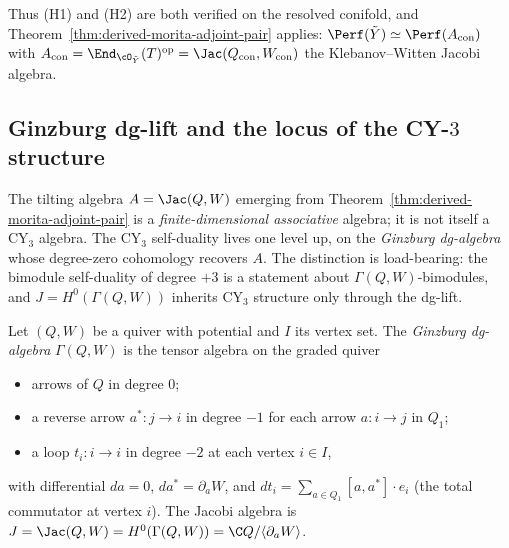 Thus (H1) and (H2) are both verified on the resolved conifold, and Theorem~\ref{thm:derived-morita-adjoint-pair} applies: $\Perf(\tilde Y) \simeq \Perf(A_{\mathrm{con}})$ with $A_{\mathrm{con}} = \End_{\cO_{\tilde Y}}(T)^{\mathrm{op}} = \Jac(Q_{\mathrm{con}}, W_{\mathrm{con}})$ the Klebanov--Witten Jacobi algebra.

\subsection{Ginzburg dg-lift and the locus of the CY-\texorpdfstring{$3$}{3} structure}
\label{subsec:ginzburg-dg-lift-cy3}

The tilting algebra $A = \Jac(Q, W)$ emerging from Theorem~\ref{thm:derived-morita-adjoint-pair} is a \emph{finite-dimensional associative} algebra; it is not itself a CY$_3$ algebra. The CY$_3$ self-duality lives one level up, on the \emph{Ginzburg dg-algebra} whose degree-zero cohomology recovers $A$. The distinction is load-bearing: the bimodule self-duality of degree $+3$ is a statement about $\Gamma(Q, W)$-bimodules, and $J = H^0(\Gamma(Q, W))$ inherits CY$_3$ structure only through the dg-lift.

\begin{definition}
\label{def:ginzburg-dg-algebra}
Let $(Q, W)$ be a quiver with potential and $I$ its vertex set. The \emph{Ginzburg dg-algebra} $\Gamma(Q, W)$ is the tensor algebra on the graded quiver
\begin{itemize}
 \item arrows of $Q$ in degree $0$;
 \item a reverse arrow $a^{*} \colon j \to i$ in degree $-1$ for each arrow $a \colon i \to j$ in $Q_1$;
 \item a loop $t_i \colon i \to i$ in degree $-2$ at each vertex $i \in I$,
\end{itemize}
with differential $d a = 0$, $d a^{*} = \partial_a W$, and $d t_i = \sum_{a \in Q_1} [a, a^{*}] \cdot e_i$ (the total commutator at vertex $i$). The Jacobi algebra is
$J = \Jac(Q, W) = H^{0}(\Gamma(Q, W)) = \C Q / \langle \partial_a W \rangle$.
\end{definition}

